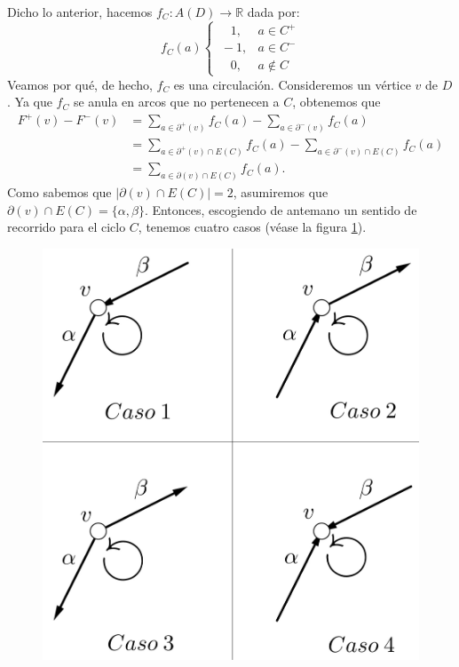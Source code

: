 Dicho lo anterior, hacemos $f_{C} \colon A(D) \rightarrow \mathbb{R}$ dada por:
$$
f_{C}(a)\left\{\begin{matrix}
\quad 1, & a \in C^{+} \\ 
\ -1, & a \in C^{-}\\ 
\quad 0, &a \notin C
\end{matrix}\right.
$$
Veamos por qué, de hecho, $f_{C}$ es una circulación. Consideremos un vértice $v$ de $D$. Ya que $f_{C}$ se anula en arcos que no pertenecen a $C$, obtenemos que
\begin{equation} \label{eq:cortescicloscasos}
    \begin{split}
               F^{+}(v) - F^{-}(v) &= \sum_{a \in \partial^{+}(v)} f_{C}(a) - \sum_{a \in \partial^{-}(v)} f_{C}(a) \\
    &= \sum_{a \in \partial^{+}(v) \cap E(C)} f_{C}(a) - \sum_{a \in \partial^{-}(v) \cap E(C)} f_{C}(a) \\
    &= \sum_{a \in \partial(v) \cap E(C)} f_{C}(a).
    \end{split}
\end{equation}
Como sabemos que $|\partial(v) \cap E(C)| = 2$, asumiremos que $\partial(v) \cap E(C) = \{\alpha, \beta\}$. Entonces, escogiendo de antemano un sentido de recorrido para el ciclo $C$, tenemos cuatro casos (véase la figura \ref{fig:casoscortesciclos}). 
 \begin{figure}[H]
\centering
\includegraphics[scale=0.2]{img/imgchapter2/digraficacicloscasos.jpg}
\caption{}
\label{fig:casoscortesciclos}
\end{figure}
